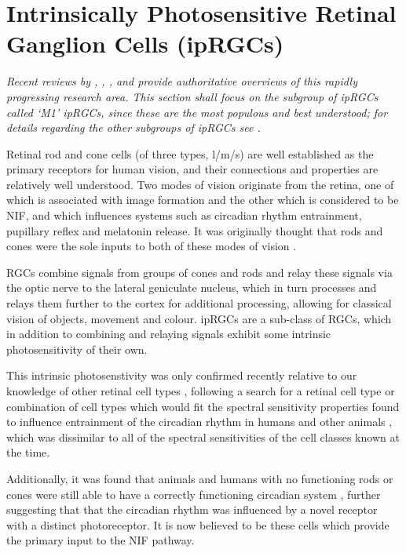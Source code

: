 \section{Intrinsically Photosensitive Retinal Ganglion Cells (ipRGCs)}
\label{sec:ipRGCs}

\textit{Recent reviews by \citet{spitschan_melanopsin_2019}, \citet{do_melanopsin_2019}, \citet{graham_melanopsin-expressing_2016}, and \citet{lucas_melanopsin_2015} provide authoritative overviews of this rapidly progressing research area. This section shall focus on the subgroup of \glspl{ipRGC} called `M1' \glspl{ipRGC}, since these are the most populous and best understood; for details regarding the other subgroups of \glspl{ipRGC} see \citet{ecker_melanopsin-expressing_2010}.}

\bigskip

Retinal rod and cone cells (of three types, l/m/s) are well established as the primary receptors for human vision, and their connections and properties are relatively well understood. Two modes of vision originate from the retina, one of which is associated with image formation and the other which is considered to be \gls{NIF}, and which influences systems such as circadian rhythm entrainment, pupillary reflex and melatonin release. It was originally thought that rods and cones were the sole inputs to both of these modes of vision \citep{hankins_melanopsin_2008}.

\Glspl{RGC} combine signals from groups of cones and rods and relay these signals via the optic nerve to the lateral geniculate nucleus, which in turn processes and relays them further to the cortex for additional processing, allowing for classical vision of objects, movement and colour. \Glspl{ipRGC} are a sub-class of \glspl{RGC}, which in addition to combining and relaying signals exhibit some intrinsic photosensitivity of their own. 

This intrinsic photosenstivity was only confirmed recently relative to our knowledge of other retinal cell types \citep{qiu_induction_2005}, following a search for a retinal cell type or combination of cell types which would fit the spectral sensitivity properties found to influence entrainment of the circadian rhythm in humans and other animals \citep{brainard_human_2001,brainard_action_2001}, which was dissimilar to all of the spectral sensitivities of the cell classes known at the time.

Additionally, it was found that animals and humans with no functioning rods or cones were still able to have a correctly functioning circadian system \citep{freedman_regulation_1999,zaidi_short-wavelength_2007}, further suggesting that that the circadian rhythm was influenced by a novel receptor with a distinct photoreceptor. It is now believed to be these cells which provide the primary input to the \gls{NIF} pathway.

